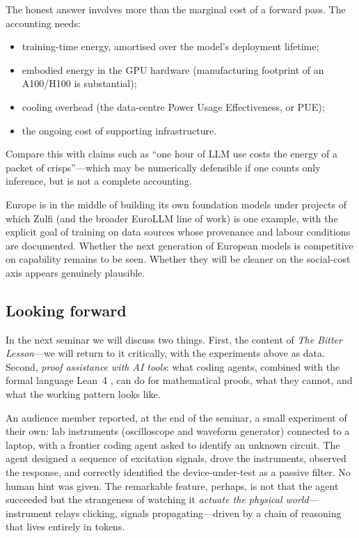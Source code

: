 \begin{remark}
  The honest answer involves more than the marginal cost
  of a forward pass.  The accounting needs:
  \begin{itemize}
    \item training-time energy, amortised over the model's
      deployment lifetime;
    \item embodied energy in the GPU hardware
      (manufacturing footprint of an A100/H100 is
      substantial);
    \item cooling overhead (the data-centre Power Usage
      Effectiveness, or PUE);
    \item the ongoing cost of supporting infrastructure.
  \end{itemize}
  Compare this with claims such as ``one hour of LLM use
  costs the energy of a packet of crisps''---which may be
  numerically defensible if one counts only inference, but
  is not a complete accounting.
\end{remark}

\begin{historical}
  Europe is in the middle of building its own foundation
  models under projects of which Zulfi (and the broader
  EuroLLM line of work) is one example, with the explicit
  goal of training on data sources whose provenance and
  labour conditions are documented.  Whether the next
  generation of European models is competitive on
  capability remains to be seen.  Whether they will be
  cleaner on the social-cost axis appears genuinely
  plausible.
\end{historical}

\subsection{Looking forward}

In the next seminar we will discuss two things.  First, the
content of \emph{The Bitter Lesson}---we will return to it
critically, with the experiments above as data.  Second,
\emph{proof assistance with AI tools}: what coding agents,
combined with the formal language Lean~4
\cite{moura2021lean}, can do for mathematical proofs, what
they cannot, and what the working pattern looks like.

\begin{audience}
  An audience member reported, at the end of the seminar, a
  small experiment of their own: lab instruments
  (oscilloscope and waveform generator) connected to a
  laptop, with a frontier coding agent asked to identify an
  unknown circuit.  The agent designed a sequence of
  excitation signals, drove the instruments, observed the
  response, and correctly identified the device-under-test
  as a passive filter.  No human hint was given.  The
  remarkable feature, perhaps, is not that the agent
  succeeded but the strangeness of watching it
  \emph{actuate the physical world}---instrument relays
  clicking, signals propagating---driven by a chain of
  reasoning that lives entirely in tokens.
\end{audience}

